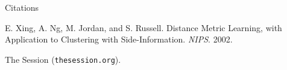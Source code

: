 \documentclass[letterpaper]{amsart}
\begin{document}
\begin{center}
\Huge
Citations
\end{center}
\huge

\begin{enumerate}[label={[\arabic*]}] \itemsep=0.2in
\item
E. Xing, A. Ng, M. Jordan, and S. Russell. Distance Metric Learning, with
Application to Clustering with Side-Information. \textit{NIPS}. 2002.

\item The Session (\texttt{thesession.org}).
\end{enumerate}

\end{document}
